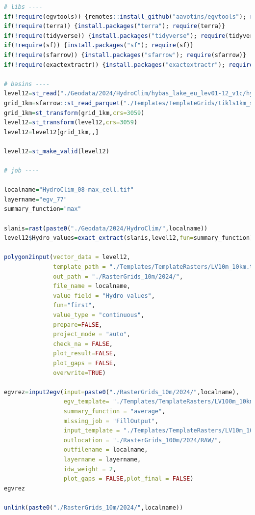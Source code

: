 \documentclass[
]{book}
\begin{document}
\begin{lstlisting}[language=R]
# libs ----
if(!require(egvtools)) {remotes::install_github("aavotins/egvtools"); require(egvtools)}
if(!require(terra)) {install.packages("terra"); require(terra)}
if(!require(tidyverse)) {install.packages("tidyverse"); require(tidyverse)}
if(!require(sf)) {install.packages("sf"); require(sf)}
if(!require(sfarrow)) {install.packages("sfarrow"); require(sfarrow)}
if(!require(exactextractr)) {install.packages("exactextractr"); require(exactextractr)}

# basins ----
level12=st_read("./Geodata/2024/HydroClim/hybas_lake_eu_lev01-12_v1c/hybas_lake_eu_lev12_v1c.shp")
grid_1km=sfarrow::st_read_parquet("./Templates/TemplateGrids/tikls1km_sauzeme.parquet")
grid_1km=st_transform(grid_1km,crs=3059)
level12=st_transform(level12,crs=3059)
level12=level12[grid_1km,,]

level12=st_make_valid(level12)

# job ----

localname="HydroClim_08-max_cell.tif"
layername="egv_77"
summary_function="max"
  
slanis=rast(paste0("./Geodata/2024/HydroClim/",localname))
level12$Hydro_values=exact_extract(slanis,level12,fun=summary_function)
  
polygon2input(vector_data = level12,
              template_path = "./Templates/TemplateRasters/LV10m_10km.tif",
              out_path = "./RasterGrids_10m/2024/",
              file_name = localname,
              value_field = "Hydro_values",
              fun="first",
              value_type = "continuous",
              prepare=FALSE,
              project_mode = "auto",
              check_na = FALSE,
              plot_result=FALSE,
              plot_gaps = FALSE,
              overwrite=TRUE)
  
egvrez=input2egv(input=paste0("./RasterGrids_10m/2024/",localname),
                 egv_template= "./Templates/TemplateRasters/LV100m_10km.tif",
                 summary_function = "average",
                 missing_job = "FillOutput",
                 input_template = "./Templates/TemplateRasters/LV10m_10km.tif",
                 outlocation = "./RasterGrids_100m/2024/RAW/",
                 outfilename = localname,
                 layername = layername,
                 idw_weight = 2,
                 plot_gaps = FALSE,plot_final = FALSE)
egvrez
  
unlink(paste0("./RasterGrids_10m/2024/",localname))
\end{lstlisting}
\end{document}
